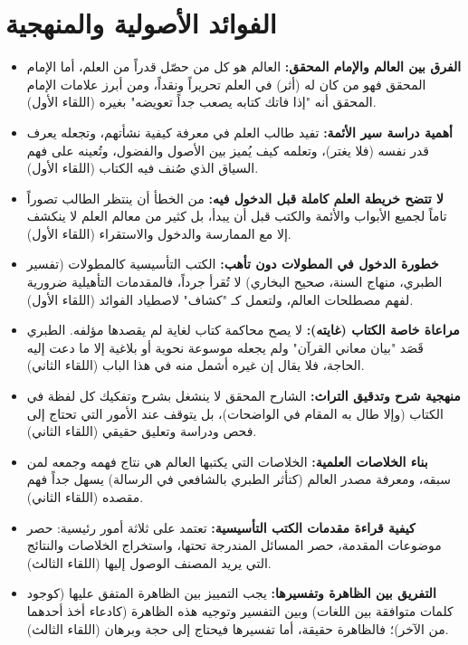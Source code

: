 \section{الفوائد الأصولية والمنهجية}
\begin{itemize}
    \item \textbf{الفرق بين العالم والإمام المحقق:} العالم هو كل من حصّل قدراً من العلم، أما الإمام المحقق فهو من كان له (أثر) في العلم تحريراً ونقداً، ومن أبرز علامات الإمام المحقق أنه "إذا فاتك كتابه يصعب جداً تعويضه" بغيره (اللقاء الأول).
    \item \textbf{أهمية دراسة سير الأئمة:} تفيد طالب العلم في معرفة كيفية نشأتهم، وتجعله يعرف قدر نفسه (فلا يغتر)، وتعلمه كيف يُميز بين الأصول والفضول، وتُعينه على فهم السياق الذي صُنف فيه الكتاب (اللقاء الأول).
    \item \textbf{لا تتضح خريطة العلم كاملة قبل الدخول فيه:} من الخطأ أن ينتظر الطالب تصوراً تاماً لجميع الأبواب والأئمة والكتب قبل أن يبدأ، بل كثير من معالم العلم لا ينكشف إلا مع الممارسة والدخول والاستقراء (اللقاء الأول).
    \item \textbf{خطورة الدخول في المطولات دون تأهب:} الكتب التأسيسية كالمطولات (تفسير الطبري، منهاج السنة، صحيح البخاري) لا تُقرأ جرداً، فالمقدمات التأهيلية ضرورية لفهم مصطلحات العالم، ولتعمل كـ "كشاف" لاصطياد الفوائد (اللقاء الأول).
    \item \textbf{مراعاة خاصة الكتاب (غايته):} لا يصح محاكمة كتاب لغاية لم يقصدها مؤلفه. الطبري قَصَد "بيان معاني القرآن" ولم يجعله موسوعة نحوية أو بلاغية إلا ما دعت إليه الحاجة، فلا يقال إن غيره أشمل منه في هذا الباب (اللقاء الثاني).
    \item \textbf{منهجية شرح وتدقيق التراث:} الشارح المحقق لا ينشغل بشرح وتفكيك كل لفظة في الكتاب (وإلا طال به المقام في الواضحات)، بل يتوقف عند الأمور التي تحتاج إلى فحص ودراسة وتعليق حقيقي (اللقاء الثاني).
    \item \textbf{بناء الخلاصات العلمية:} الخلاصات التي يكتبها العالم هي نتاج فهمه وجمعه لمن سبقه، ومعرفة مصدر العالم (كتأثر الطبري بالشافعي في الرسالة) يسهل جداً فهم مقصده (اللقاء الثاني).
    \item \textbf{كيفية قراءة مقدمات الكتب التأسيسية:} تعتمد على ثلاثة أمور رئيسية: حصر موضوعات المقدمة، حصر المسائل المندرجة تحتها، واستخراج الخلاصات والنتائج التي يريد المصنف الوصول إليها (اللقاء الثالث).
    \item \textbf{التفريق بين الظاهرة وتفسيرها:} يجب التمييز بين الظاهرة المتفق عليها (كوجود كلمات متوافقة بين اللغات) وبين التفسير وتوجيه هذه الظاهرة (كادعاء أخذ أحدهما من الآخر)؛ فالظاهرة حقيقة، أما تفسيرها فيحتاج إلى حجة وبرهان (اللقاء الثالث).

\end{itemize}
